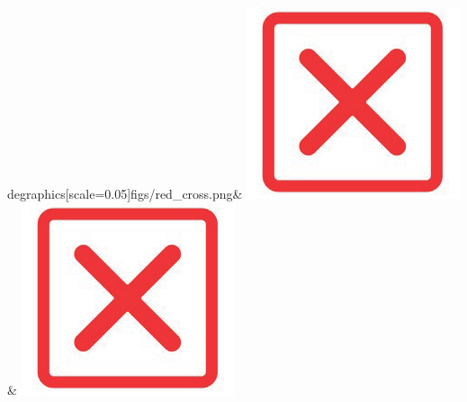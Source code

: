 \begin{table}[H]
{\begin{tabular}[t]
degraphics[scale=0.05]{figs/red_cross.png}& \includegraphics[scale=0.05]{figs/red_cross.png}& \includegraphics[scale=0.05]{figs/red_cross.png}\\
\midrule

\end{tabular}}
\end{table}
